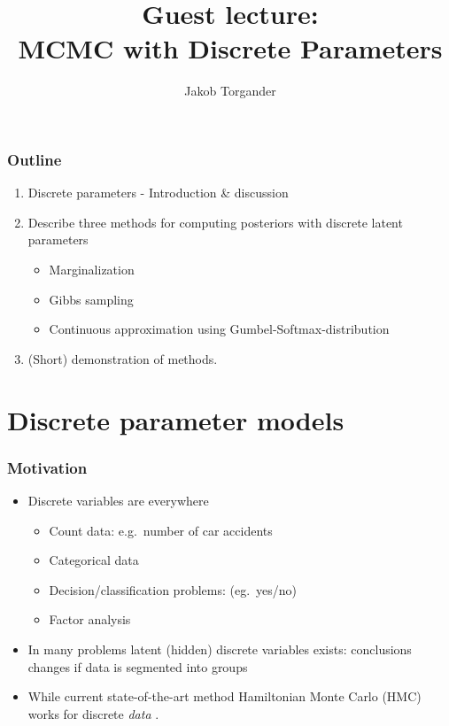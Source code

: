 \documentclass[10pt]{beamer}
\title[]{{\color{black}Guest lecture: \\MCMC with Discrete Parameters}}
\author[]{Jakob Torgander}
\date{}
\begin{document}
\frame{\titlepage
}


\begin{frame}
	\frametitle{Outline}
		\begin{enumerate}
			\item Discrete parameters - Introduction \& discussion
			\item Describe three methods for computing posteriors with discrete latent parameters
			\begin{itemize}
				\item Marginalization
				\item Gibbs sampling
				\item Continuous approximation using Gumbel-Softmax-distribution
			\end{itemize}
			\item (Short) demonstration of methods.
		\end{enumerate}
\end{frame}

\section{Discrete parameter models}

\begin{frame}
	\frametitle{Motivation}
	\begin{itemize}
		\item Discrete variables are everywhere
		\begin{itemize}
		 	\item Count data: e.g.\ number of car accidents
		 	\item Categorical data 
 			\item Decision/classification problems: (eg.\ yes/no)
 			\item Factor analysis
	 	\end{itemize}
		\item In many problems latent (hidden) discrete variables exists: conclusions changes if data is segmented into groups
		\item While current state-of-the-art method Hamiltonian Monte Carlo (HMC) works for discrete \textit{data} .
		\end{itemize}
\end{frame}
\end{document}
